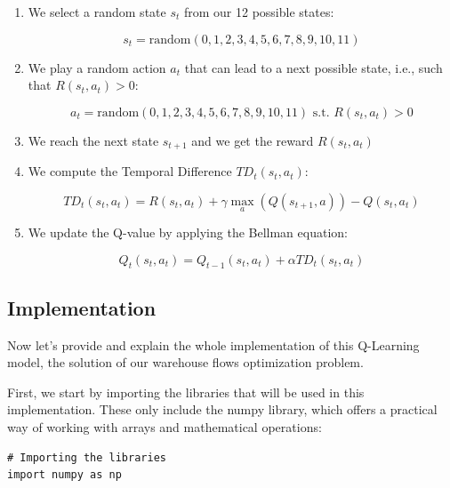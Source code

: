 \documentclass[]{book}
\begin{document}
\begin{enumerate}

\item We select a random state $s_t$ from our 12 possible states:

\begin{equation*}
    s_t = \textrm{random}(0,1,2,3,4,5,6,7,8,9,10,11)
\end{equation*}

\item We play a random action $a_t$ that can lead to a next possible state, i.e., such that $R(s_t,a_t) > 0$:

\begin{equation*}
a_t = \textrm{random}(0,1,2,3,4,5,6,7,8,9,10,11) \textrm{ s.t. } R(s_t,a_t) > 0
\end{equation*}

\item We reach the next state $s_{t+1}$ and we get the reward $R(s_t,a_t)$

\item We compute the Temporal Difference $TD_t(s_t,a_t)$:

\begin{equation*}
TD_t(s_t,a_t) = R(s_t,a_t) + \gamma \underset{a}{\max}(Q(s_{t+1},a)) - Q(s_t, a_t)
\end{equation*}

\item We update the Q-value by applying the Bellman equation:

\begin{equation*}
Q_t(s_t,a_t) = Q_{t-1}(s_t,a_t) + \alpha TD_t(s_t,a_t)
\end{equation*}

\end{enumerate}

\newpage

\subsection{Implementation}

Now let's provide and explain the whole implementation of this Q-Learning model, the solution of our warehouse flows optimization problem.

First, we start by importing the libraries that will be used in this implementation. These only include the numpy library, which offers a practical way of working with arrays and mathematical operations:

\begin{lstlisting}
# Importing the libraries
import numpy as np
\end{lstlisting}
\end{document}
